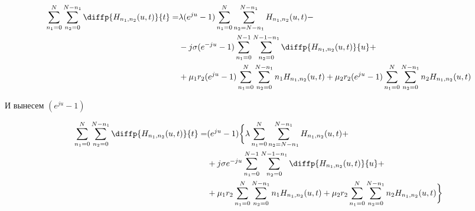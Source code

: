 \begin{equation*}
	\begin{aligned}
		\sum_{n_1=0}^N\sum_{n_2=0}^{N-n_1} \diffp{H_{n_1,n_2}(u,t)}{t}=
		&\lambda (e^{ju} - 1)\sum_{n_1=0}^N\sum_{n_2=N-n_1}^{N-n_1} 
		H_{n_1, n_2}(u,t)-\\
		&- j \sigma(e^{-ju}-1)\sum_{n_1=0}^{N-1}\sum_{n_2=0}^{N-1-n_1} 
		\diffp{H_{n_1, n_2}(u,t)}{u}+\\
		&+\mu_1 r_2 (e^{ju} -1)\sum_{n_1=0}^{N}\sum_{n_2=0}^{N-n_1} 
		n_1 H_{n_1, n_2}(u,t)
		+\mu_2 r_2 (e^{ju} -1)\sum_{n_1=0}^{N}\sum_{n_2=0}^{N-n_1} 
		n_2 H_{n_1, n_2}(u,t)\\
	\end{aligned}
\end{equation*}

И вынесем $(e^{ju} - 1)$

\begin{equation*}
	\begin{aligned}
		\sum_{n_1=0}^N\sum_{n_2=0}^{N-n_1} \diffp{H_{n_1,n_2}(u,t)}{t}=
		&(e^{ju} - 1)\bigg\{\lambda \sum_{n_1=0}^N\sum_{n_2=N-n_1}^{N-n_1} 
		H_{n_1, n_2}(u,t)+\\
		&+ j \sigma e^{-ju}\sum_{n_1=0}^{N-1}\sum_{n_2=0}^{N-1-n_1} 
		\diffp{H_{n_1, n_2}(u,t)}{u}+\\
		&+\mu_1 r_2 \sum_{n_1=0}^{N}\sum_{n_2=0}^{N-n_1} 
		n_1 H_{n_1, n_2}(u,t)
		+\mu_2 r_2 \sum_{n_1=0}^{N}\sum_{n_2=0}^{N-n_1} 
		n_2 H_{n_1, n_2}(u,t)\bigg\}\\
	\end{aligned}
\end{equation*}
